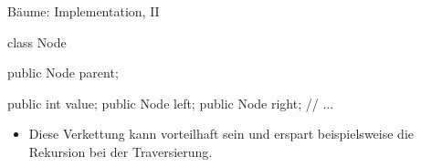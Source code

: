 \begin{frame}[fragile]{Bäume: Implementation, II}
    \pause\begin{minipage}[c]{.4\linewidth}
\small%
\begin{plainjava}
class Node {
    public Node parent;

    public int value;
    public Node left;
    public Node right;
    // ...
}
\end{plainjava}
    \end{minipage}\hfill{}\pause\begin{minipage}[c]{.55\linewidth}%
\centering{}
\end{minipage}\vfill
    \begin{itemize}[<+(1)->]
        \widei
        \item Diese Verkettung kann vorteilhaft sein und erspart beispielsweise die Rekursion bei der Traversierung.
    \end{itemize}
\end{frame}

